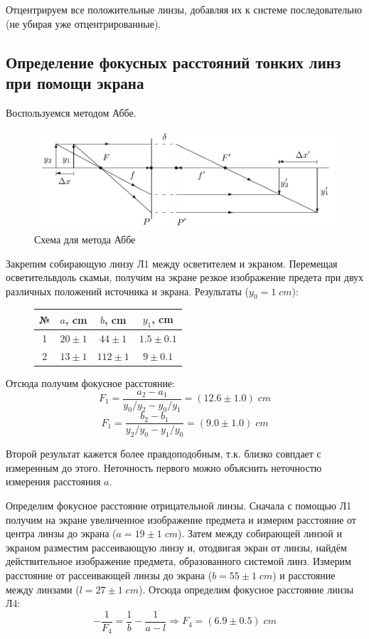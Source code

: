 \documentclass{article}
\begin{document}
Отцентрируем все положительные линзы, добавляя их к системе последовательно (не убирая уже отцентрированные).

\subsection{Определение фокусных расстояний тонких линз при помощи экрана}
Воспользуемся методом Аббе.
\begin{figure}[H]
  \centering
  \includegraphics[width = \textwidth]{Abbe.png}
  \caption{Схема для метода Аббе}
\end{figure}

Закрепим собирающую линзу Л1 между осветителем и экраном. Перемещая осветительвдоль скамьи, получим на
экране резкое изображение предета при двух различных положений источника и экрана. Результаты (\(y_0 = 1\; cm\)):

\begin{figure}[H]
  \centering
  \begin{tabular}{|c|c|c|c|}
    \hline
    № & \(a\), cm    & \(b\), cm    & \(y_1\), cm\\\hline
    1 & \(20 \pm 1\) & \(44 \pm 1\) & \(1.5\pm 0.1\) \\\hline
    2 & \(13 \pm 1\) & \(112 \pm 1\) & \(9\pm 0.1\) \\\hline
  \end{tabular}
\end{figure}

Отсюда получим фокусное расстояние:
\[ F_1 = \frac{a_2 - a_1}{y_0/y_2 - y_0/y_1} = (12.6 \pm 1.0)\; cm \]
\[ F_1 = \frac{b_2 - b_1}{y_2/y_0 - y_1/y_0} = (9.0 \pm 1.0)\; cm \]

Второй результат кажется более правдоподобным, т.к. близко совпдает с измеренным до этого. Неточность
первого можно объяснить неточностю измерения расстояния \(a\).

Определим фокусное расстояние отрицательной линзы. Сначала с помощью Л1 получим на экране
увеличенное изображение предмета и измерим расстояние от центра линзы до экрана (\(a = 19\pm1\; cm\)). Затем
между собирающей линзой и экраном разместим рассеивающую линзу и, отодвигая экран от линзы, найдём 
действительное изображение предмета, образованного системой линз.
Измерим расстояние от рассеивающей линзы до экрана (\(b = 55 \pm 1\; cm\)) и расстояние между линзами 
(\(l = 27 \pm 1\; cm\)). Отсюда определим фокусное расстояние линзы Л4:
\[ -\frac{1}{F_4} = \frac{1}{b} - \frac{1}{a-l} \Rightarrow F_4 = (6.9\pm 0.5)\;cm\]
\end{document}
